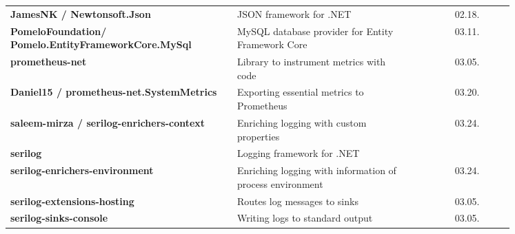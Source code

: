 \begin{table}[h!]
{\begin{tabular}{ p{0.45\linewidth} p{0.35\linewidth} r p{0.05\linewidth} }
          \textbf{JamesNK / Newtonsoft.Json} & JSON framework for .NET & 02.18. \\
          
          \addlinespace[0.2cm]
          \midrule
          \addlinespace[0.2cm]
          
          \textbf{\small PomeloFoundation/ Pomelo.EntityFrameworkCore.MySql} & MySQL database provider for Entity Framework Core & 03.11. \\
          
          \addlinespace[0.2cm]
          \midrule
          \addlinespace[0.2cm]
          
          \textbf{prometheus-net} & Library to instrument metrics with code & 03.05. \\
          
          \addlinespace[0.2cm]
          \midrule
          \addlinespace[0.2cm]
          
          \textbf{\small Daniel15 / prometheus-net.SystemMetrics} & Exporting essential metrics to Prometheus & 03.20. \\
          
          \addlinespace[0.2cm]
          \midrule
          \addlinespace[0.2cm]
          
          \textbf{saleem-mirza / serilog-enrichers-context} & Enriching logging with custom properties & 03.24. \\
          
          \addlinespace[0.2cm]
          \midrule
          \addlinespace[0.2cm]
          
          \textbf{serilog} & Logging framework for .NET \\
          
          \addlinespace[0.2cm]
          
          \textbf{serilog-enrichers-environment} & Enriching logging with information of process environment & 03.24. \\
          
          \addlinespace
          
          \textbf{serilog-extensions-hosting} & Routes log messages to sinks & 03.05. \\
          
          \addlinespace
          
          \textbf{serilog-sinks-console} & Writing logs to standard output & 03.05. \\
          

\end{tabular}}
\end{table}
